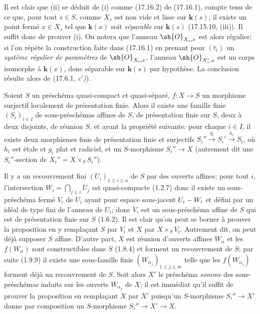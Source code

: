 Il est clair que (ii) se déduit de (i) comme (17.16.2) de (17.16.1), compte tenu de ce que, pour tout $s\in S$, comme $X_s$ est non vide et lisse sur $\boldsymbol{k}(s)$, il existe un point fermé $x\in X_s$ tel que $\boldsymbol{k}(x)$ soit \emph{séparable} sur $\boldsymbol{k}(s)$ (17.15.10, (iii)). Il suffit donc de prouver (i). On notera que l'anneau $\sh{O}_{X_s,x}$ est alors régulier; si l'on répète la construction faite dans (17.16.1) en prenant pour $(t_i)$ un \emph{système régulier de paramètres} de $\sh{O}_{X_s,x}$, l'anneau $\sh{O}_{X'_s,x}$ est un corps isomorphe à $\boldsymbol{k}(x)$, donc séparable sur $\boldsymbol{k}(s)$ par hypothèse. La conclusion résulte alors de (17.6.1, \emph{c$'$)}).

\begin{proposition}[17.16.4]
\label{IV.17.16.4}
Soient $S$ un préschéma quasi-compact et quasi-séparé, $f:X\to S$ un morphisme surjectif localement de présentation finie. Alors il existe une famille finie $(S_i)_{i\in I}$
de sous-préschémas affines de $S$, de présentation finie sur $S$, deux à deux disjoints, de réunion $S$, et ayant la propriété suivante: pour chaque $i\in I$, il existe deux morphismes finis de présentation finie et surjectifs $S_i''\xrightarrow{g_i}S_i'\xrightarrow{h_i}S_i$, où $h_i$ est étale et $g_i$ plat et radiciel, et un $S$-morphisme $S_i''\to X$ \textup{(autrement dit une} $S_i''$-section \textup{de} $X_i''=X\times_S S_i''$\textup{)}.
\end{proposition}

Il y a un recouvrement fini $(U_i)_{1\leq i\leq n}$ de $S$ par des ouverts affines; pour tout $i$, l'intersection $W_i=\bigcap_{j\leq i}U_j$ est quasi-compacte (1.2.7) donc il existe un sous-préschéma fermé $V_i$ de $U_i$ ayant pour espace sous-jacent $U_i- W_i$ et défini par un idéal de type fini de l'anneau de $U_i$; donc $V_i$ est un sous-préschéma affine de $S$ qui est de présentation finie sur $S$ (1.6.2). Il est clair qu'on peut se borner à prouver la proposition en y remplaçant $S$ par $V_i$ et $X$ par $X\times_S V_i$. Autrement dit, on peut déjà supposer $S$ affine. D'autre part, $X$ est réunion d'ouverts affines $W_\alpha$ et les $f(W_\alpha)$ sont constructibles dans $S$ (1.8.4) et forment un recouvrement de $S$; par suite (1.9.9) il existe une sous-famille finie $(W_{\alpha_j})_{1\leq j\leq m}$ telle que les $f(W_{\alpha_j})$ forment déjà un recouvrement de $S$. Soit alors $X'$ le préschéma \emph{somme} des sous-préschémas induits sur les ouverts $W_{\alpha_j}$ de $X$; il est immédiat qu'il suffit de prouver la proposition en remplaçant $X$ par $X'$ puisqu'un $S$-morphisme $S_i''\to X'$ donne par composition un $S$-morphisme $S_i''\to X'\to X$.

